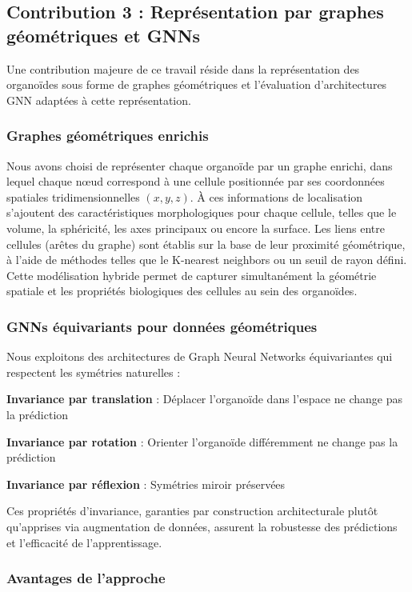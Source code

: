 \subsection{Contribution 3 : Représentation par graphes géométriques et GNNs}

Une contribution majeure de ce travail réside dans la représentation des organoïdes sous forme de graphes géométriques et l'évaluation d'architectures GNN adaptées à cette représentation.

\subsubsection{Graphes géométriques enrichis}

Nous avons choisi de représenter chaque organoïde par un graphe enrichi, dans lequel chaque nœud correspond à une cellule positionnée par ses coordonnées spatiales tridimensionnelles $(x, y, z)$. À ces informations de localisation s’ajoutent des caractéristiques morphologiques pour chaque cellule, telles que le volume, la sphéricité, les axes principaux ou encore la surface. Les liens entre cellules (arêtes du graphe) sont établis sur la base de leur proximité géométrique, à l’aide de méthodes telles que le K-nearest neighbors ou un seuil de rayon défini. Cette modélisation hybride permet de capturer simultanément la géométrie spatiale et les propriétés biologiques des cellules au sein des organoïdes.

\subsubsection{GNNs équivariants pour données géométriques}

Nous exploitons des architectures de Graph Neural Networks équivariantes qui respectent les symétries naturelles :

\textbf{Invariance par translation} : Déplacer l'organoïde dans l'espace ne change pas la prédiction

\textbf{Invariance par rotation} : Orienter l'organoïde différemment ne change pas la prédiction

\textbf{Invariance par réflexion} : Symétries miroir préservées

Ces propriétés d'invariance, garanties par construction architecturale plutôt qu'apprises via augmentation de données, assurent la robustesse des prédictions et l'efficacité de l'apprentissage.

\subsubsection{Avantages de l'approche}

